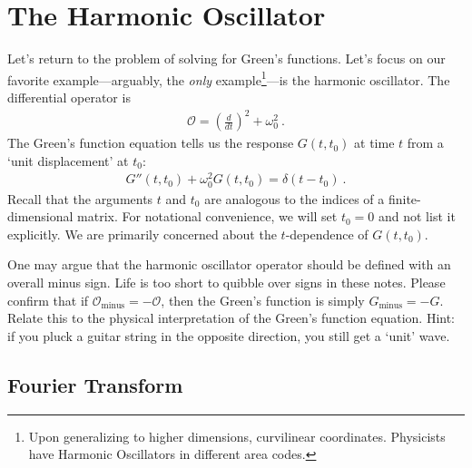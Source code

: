 
\section{The Harmonic Oscillator}

Let's return to the problem of solving for Green's functions. Let's focus on our favorite example---arguably, the \emph{only} example\footnote{Upon generalizing to higher dimensions, curvilinear coordinates. Physicists have Harmonic Oscillators in different area codes.}---is the harmonic oscillator. The differential operator is
\begin{align}
	\mathcal O = \left(\frac{d}{dt}\right)^2 + \omega_0^2 \ .
	\label{eq:O:HO}
\end{align}
The Green's function equation tells us the response $G(t,t_0)$ at time $t$ from a `unit displacement' at $t_0$:
\begin{align}
	G''(t,t_0) + \omega_0^2 G(t,t_0) = \delta(t-t_0) \ .
	\label{eq:HO:Greens:eqn}
\end{align}
Recall that the arguments $t$ and $t_0$ are analogous to the indices of a finite-dimensional matrix. For notational convenience, we will set $t_0=0$ and not list it explicitly. We are primarily concerned about the $t$-dependence of $G(t,t_0)$. 

\begin{exercise}
One may argue that the harmonic oscillator operator should be defined with an overall minus sign. Life is too short to quibble over signs in these notes. Please confirm that if  $\mathcal O_\text{minus} = -\mathcal O$, then the Green's function is simply $G_\text{minus} = - G$. Relate this to the physical interpretation of the Green's function equation. {Hint:} if you pluck a guitar string in the opposite direction, you still get a `unit' wave.
\end{exercise}

\subsection{Fourier Transform}

